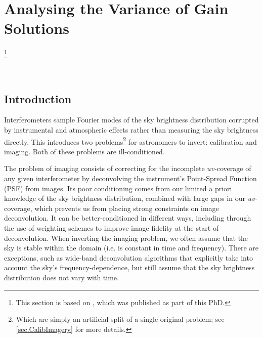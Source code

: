 \chapter{Analysing the Variance of Gain Solutions}\footnote{This section is based on , which was published as part of this PhD.}\label{chapter.paper}
\minitoc

\

\section{Introduction}\label{sec.intro}

\pg
Interferometers sample Fourier modes of the sky brightness distribution corrupted by instrumental and atmospheric effects rather than measuring the sky brightness directly.
This introduces two problems\footnote{Which are simply an artificial split of a single original problem; see \cref{sec.CalibImagery} for more details.} for astronomers to invert: calibration and imaging. Both of these problems are ill-conditioned.

\pg
The problem of imaging consists of correcting for the incomplete $uv$-coverage of any given interferometer by deconvolving the instrument's {Point-Spread Function (PSF)} from images. Its poor conditioning comes from our limited a priori knowledge of the sky brightness distribution, combined with large gaps in our $uv$-coverage, which prevents us from placing strong constraints on image deconvolution. It can be better-conditioned in different ways, including through the use of weighting schemes \citep[see][and references therein]{1995AAS...18711202B,2014MNRAS.444..790Y} to improve image fidelity at the start of deconvolution. When inverting the imaging problem, we often assume that {the sky} is stable within the domain (i.e. {is} constant in time and frequency). There are exceptions, such as wide-band deconvolution algorithms \citep[e.g.][]{2011A&A...532A..71R} that explicitly take into account the {sky}'s frequency-dependence, but still assume that the sky brightness distribution does not vary with time.


